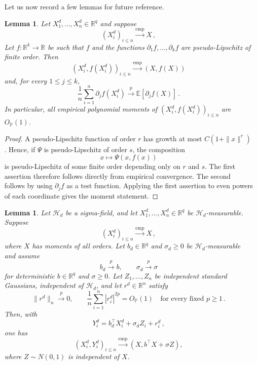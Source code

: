 \documentclass[11pt]{article}
\newtheorem{lemma}[theorem]{Lemma}
\theoremstyle{definition}
\theoremstyle{remark}
\numberwithin{equation}{section}
\numberwithin{theorem}{section}
\newcommand{\R}{\mathbb R}
\newcommand{\E}{\mathbb E}
\newcommand{\Prob}{\mathbb P}
\newcommand{\abs}[1]{\left\lvert #1\right\rvert}
\newcommand{\xto}{\xrightarrow}
\begin{document}

Let us now record a few lemmas for future reference. 

\begin{lemma}
\label{lem:emp-calc}
Let $X_1^d,\ldots,X_n^d\in\R^q$ and suppose
\[
  (X_i^d)_{i\le n}\xto{\mathrm{emp}}X\,,
\]
Let
$f:\R^k\to\R$ be such that $f$ and the functions
$\partial_1 f,\ldots,\partial_{k}f$ are pseudo-Lipschitz of finite
order.  Then
\[
 (X_i^d,f(X_i^d))_{i\le n}
 \xrightarrow{\mathrm{emp}}(X,f(X))
\]
and, for every $1\le j\le k$,
\[
 \frac1n\sum_{i=1}^n\partial_j f(X_i^d)
 \xrightarrow{p}\E[\partial_j f(X)]\,.
\]
In particular, all empirical polynomial moments of $(X_i^d,f(X_i^d))_{i \le n}$ are $O_{\Prob}(1)$.
\end{lemma}

\begin{proof}
A pseudo-Lipschitz function of order $r$ has growth at most
$C(1+\|x\|^r)$.  Hence, if $\Psi$ is pseudo-Lipschitz of order
$s$, the composition
\[
 x\longmapsto\Psi(x,f(x))
\]
is pseudo-Lipschitz of some finite order depending only on $r$ and
$s$.  The first assertion therefore follows directly from empirical
convergence.  The second follows by using $\partial_jf$ as a
test function.  Applying the first assertion to even powers of each
coordinate gives the moment statement.
\end{proof}



\begin{lemma}
\label{lem:conditional-empirical}
Let $\mathscr H_d$ be a sigma-field, and let
$X_1^d,\ldots,X_n^d\in\R^q$ be $\mathscr H_d$-measurable.  Suppose
\[
  (X_i^d)_{i\le n}\xto{\mathrm{emp}}X\,,
\]
where $X$ has moments of all orders.  Let $b_d\in\R^q$ and
$\sigma_d\ge0$ be $\mathscr H_d$-measurable and assume
\[
  b_d\xto{p}b,\qquad \sigma_d\xto{p}\sigma
\]
for deterministic $b\in\R^q$ and $\sigma\ge0$.  Let
$Z_1,\ldots,Z_n$ be independent standard Gaussians, independent of
$\mathscr H_d$, and let $r^d\in\R^n$ satisfy
\begin{equation}\label{eq:conditional-empirical-error}
  \big\|r^d\big\|_n\xto{p}0,
  \qquad
  \frac1n\sum_{i=1}^n\abs{r_i^d}^{2p}=O_{\Prob}(1)
  \quad\text{for every fixed }p\ge1\,.
\end{equation}
Then, with
\[
  Y_i^d=b_d^\top X_i^d+\sigma_dZ_i+r_i^d\,,
\]
one has
\[
  (X_i^d,Y_i^d)_{i\le n}
  \xto{\mathrm{emp}}
  (X,b^\top X+\sigma Z),
\]
where $Z\sim N(0,1)$ is independent of $X$.
\end{lemma}
\end{document}
